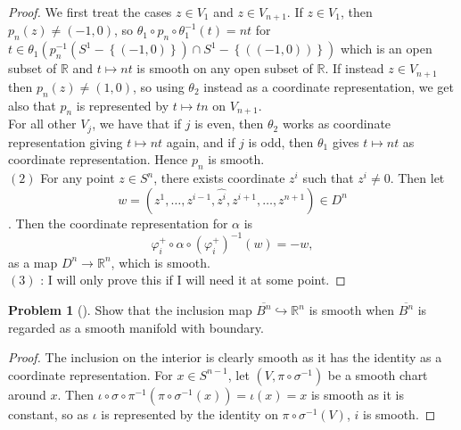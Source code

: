 \documentclass[reqno]{amsart}
\theoremstyle{plain}%
\theoremstyle{definition}
\newtheorem{problem}[theorem]{Problem}
\theoremstyle{remark}
\begin{document}
\begin{proof}
        We first treat the cases $z \in V_1$ and $z \in V_{n+1}$.
        If $z \in V_1$, then $p_n(z) \neq (-1,0)$, so
        $\theta_1 \circ p_n \circ \theta_1^{-1} (t) =
        nt$ for $t \in \theta_1 \left( p_n^{-1}\left( S^{1} - 
        \left\{ \left( -1,0 \right)  \right\} \right) \cap 
    S^{1} - \left\{ \left( (-1,0) \right)  \right\} \right)  $ which is
    an open subset of $\mathbb{R}$ and 
    $t \mapsto nt$ is smooth on any open subset of $\mathbb{R}$.
    If instead $z \in V_{n+1}$ then $p_n(z) \neq \left( 1,0 \right) $, so
    using $\theta_2$ instead as a coordinate representation, we get
    also that $p_n$ is represented by $t \mapsto tn$ on
    $V_{n+1}$.\\
    For all other $V_j$, we have that if $j$ is even, then
     $\theta_2$ works as coordinate representation giving $t \mapsto nt$ again,
     and if $j$ is odd, then $\theta_1$ gives $t \mapsto nt$ as coordinate
     representation. Hence $p_n$ is smooth.\\
     \linebreak
     $(2)$ For any point $z \in S^{n}$, there exists coordinate
     $z^{i}$ such that $z^{i}\neq 0$. Then
     let $$w = \left( z^{1}, \ldots, z^{i-1},\hat{z^{i}} , z^{i+1},\ldots, z^{n+1} \right) 
     \in D^{n}$$. Then the coordinate representation for $\alpha$ is
     \[
     \varphi_i^{+} \circ \alpha \circ \left( \varphi_i^{+} \right)^{-1} (w)
     = -w,
     \] 
     as a map $D^{n} \to \mathbb{R}^{n}$, which is smooth.\\
     \linebreak
     $(3)$ : I will only prove this if I will need it at some point.
     \todo{}
    \end{proof}

    \begin{problem}[]
        Show that the inclusion map
        $\overline{B^{n}} \hookrightarrow \mathbb{R}^{n}$ is smooth when
        $\overline{B^{n}}$ is regarded as a smooth manifold with boundary.
    \end{problem}

    \begin{proof}
        The inclusion on the interior is clearly smooth as it has the identity
        as a coordinate representation.
        For $x \in S^{n-1}$, let $\left( V, \pi \circ \sigma^{-1} \right) $ be
        a smooth chart around $x$. Then
        $\iota \circ \sigma  \circ \pi^{-1} \left( \pi \circ \sigma^{-1}(x) \right) 
        = \iota (x) = x$ is smooth as it is constant, so
        as $\iota $ is represented by the identity on
        $\pi \circ \sigma^{-1} \left( V \right) $,
        $i$ is smooth.
    \end{proof}
\end{document}
